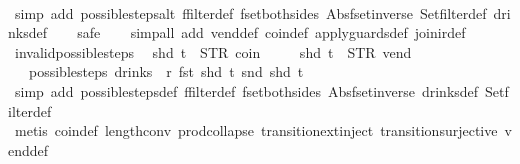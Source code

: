 \begin{isabellebody}
%
\isadelimproof
\ \ %
\endisadelimproof
%
\isatagproof
{}\isamarkupfalse%
\ {\isacharparenleft}simp\ add{\isacharcolon}\ possible{\isacharunderscore}steps{\isacharunderscore}alt\ ffilter{\isacharunderscore}def\ fset{\isacharunderscore}both{\isacharunderscore}sides\ Abs{\isacharunderscore}fset{\isacharunderscore}inverse\ Set{\isachardot}filter{\isacharunderscore}def\ drinks{\isacharunderscore}def{\isacharparenright}\isanewline
\ \ \isamarkupfalse%
\ safe\isanewline
\ \ \isamarkupfalse%
\ {\isacharparenleft}simp{\isacharunderscore}all\ add{\isacharcolon}\ vend{\isacharunderscore}def\ coin{\isacharunderscore}def\ apply{\isacharunderscore}guards{\isacharunderscore}def\ join{\isacharunderscore}ir{\isacharunderscore}def{\isacharparenright}%
\endisatagproof
{\isafoldproof}%
%
\isadelimproof
\isanewline
%
\endisadelimproof
\isanewline
{}\isamarkupfalse%
\ invalid{\isacharunderscore}possible{\isacharunderscore}steps{\isacharunderscore}{}{\isacharcolon}\isanewline
\ \ {\isachardoublequoteopen}shd\ t\ {\isasymnoteq}\ {\isacharparenleft}STR\ {\isacharprime}{\isacharprime}coin{\isacharprime}{\isacharprime}{\isacharcomma}\ {\isacharbrackleft}{\isacharbrackright}{\isacharparenright}\ {\isasymLongrightarrow}\isanewline
\ \ \ shd\ t\ {\isasymnoteq}\ {\isacharparenleft}STR\ {\isacharprime}{\isacharprime}vend{\isacharprime}{\isacharprime}{\isacharcomma}\ {\isacharbrackleft}{\isacharbrackright}{\isacharparenright}\ {\isasymLongrightarrow}\isanewline
\ \ \ possible{\isacharunderscore}steps\ drinks\ {}\ r\ {\isacharparenleft}fst\ {\isacharparenleft}shd\ t{\isacharparenright}{\isacharparenright}\ {\isacharparenleft}snd\ {\isacharparenleft}shd\ t{\isacharparenright}{\isacharparenright}\ {\isacharequal}\ {\isacharbraceleft}{\isacharbar}{\isacharbar}{\isacharbraceright}{\isachardoublequoteclose}\isanewline
%
\isadelimproof
\ \ %
\endisadelimproof
%
\isatagproof
{}\isamarkupfalse%
\ {\isacharparenleft}simp\ add{\isacharcolon}\ possible{\isacharunderscore}steps{\isacharunderscore}def\ ffilter{\isacharunderscore}def\ fset{\isacharunderscore}both{\isacharunderscore}sides\ Abs{\isacharunderscore}fset{\isacharunderscore}inverse\ drinks{\isacharunderscore}def\ Set{\isachardot}filter{\isacharunderscore}def{\isacharparenright}\isanewline
\ \ \isamarkupfalse%
\ {\isacharparenleft}metis\ coin{\isacharunderscore}def\ length{\isacharunderscore}{}{\isacharunderscore}conv\ prod{\isachardot}collapse\ transition{\isachardot}ext{\isacharunderscore}inject\ transition{\isachardot}surjective\ vend{\isacharunderscore}def{\isacharparenright}%

\end{isabellebody}

